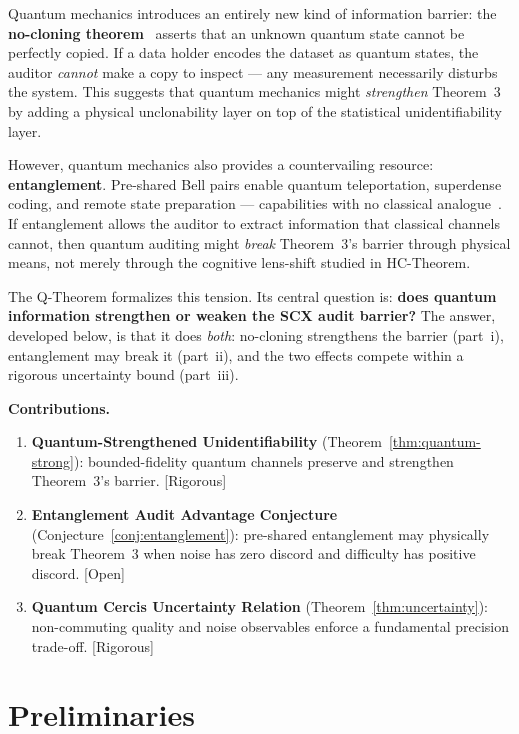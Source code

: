 \documentclass[12pt,a4paper]{article}
\newcommand{\rigorous}{\textcolor{green!50!black}{\small\textsf{[Rigorous]}}}
\newcommand{\openquest}{\textcolor{red!70!black}{\small\textsf{[Open]}}}
\begin{document}
Quantum mechanics introduces an entirely new kind of information barrier: the
\textbf{no-cloning theorem}~\citep{wootters1982single} asserts that an unknown
quantum state cannot be perfectly copied.  If a data holder encodes the dataset
as quantum states, the auditor \emph{cannot} make a copy to inspect — any
measurement necessarily disturbs the system.  This suggests that quantum
mechanics might \emph{strengthen} Theorem~3 by adding a physical
unclonability layer on top of the statistical unidentifiability layer.

However, quantum mechanics also provides a countervailing resource:
\textbf{entanglement}.  Pre-shared Bell pairs enable quantum teleportation,
superdense coding, and remote state preparation — capabilities with no
classical analogue~\citep{nielsen2010quantum}.  If entanglement allows the
auditor to extract information that classical channels cannot, then quantum
auditing might \emph{break} Theorem~3's barrier through physical means, not
merely through the cognitive lens-shift studied in HC-Theorem.

The Q-Theorem formalizes this tension.  Its central question is: \textbf{does
quantum information strengthen or weaken the SCX audit barrier?}  The answer,
developed below, is that it does \emph{both}: no-cloning strengthens the
barrier (part~i), entanglement may break it (part~ii), and the two effects
compete within a rigorous uncertainty bound (part~iii).

\medskip\noindent
\textbf{Contributions.}
\begin{enumerate}[label=(\arabic*)]
    \item \textbf{Quantum-Strengthened Unidentifiability}
          (Theorem~\ref{thm:quantum-strong}): bounded-fidelity quantum channels
          preserve and strengthen Theorem~3's barrier.  \rigorous
    \item \textbf{Entanglement Audit Advantage Conjecture}
          (Conjecture~\ref{conj:entanglement}): pre-shared entanglement may
          physically break Theorem~3 when noise has zero discord and difficulty
          has positive discord.  \openquest
    \item \textbf{Quantum Cercis Uncertainty Relation}
          (Theorem~\ref{thm:uncertainty}): non-commuting quality and noise
          observables enforce a fundamental precision trade-off.  \rigorous
\end{enumerate}

\section{Preliminaries}
\end{document}
